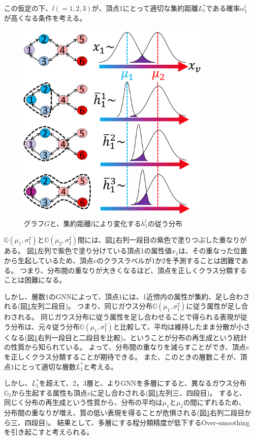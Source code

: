 \documentclass[a4j,twocolumn]{jsarticle}
\begin{document}
この仮定の下、$l(=1,2,3)$が、頂点1にとって適切な集約距離$L_1^*$である確率$\alpha_1^l$が高くなる条件を考える。

\begin{figure}[!h]
  \centering
  \includegraphics[height=10cm,width=9.5cm]{example.pdf}
  \vspace{-6mm}
  \caption{グラフ$G$と、集約距離$l$により変化する$h_1^l$の従う分布}
  \label{fig_example}
\end{figure}

$\mathbb{G}(\mu_1, \sigma_1^2)$と$\mathbb{G}(\mu_2, \sigma_2^2)$間には、図\ref{fig_example}右列一段目の紫色で塗りつぶした重なりがある。
図\ref{fig_example}左列で紫色で塗り分けている頂点1の属性値$x_1$は、その重なった位置から生起しているため、頂点$v$のクラスラベルが1か2を予測することは困難である。
つまり、分布間の重なりが大きくなるほど、頂点を正しくクラス分類することは困難になる。

しかし、層数1のGNNによって、頂点$1$には、1近傍内の属性が集約、足し合わされる(図\ref{fig_example}左列二段目)。
つまり、同じガウス分布$\mathbb{G}(\mu_1, \sigma_1^2)$に従う属性が足し合わされる。
同じガウス分布に従う属性を足し合わせることで得られる表現が従う分布は、元々従う分布$\mathbb{G}(\mu_1, \sigma_1^2)$と比較して、平均は維持したまま分散が小さくなる(図\ref{fig_example}右列一段目と二段目を比較)、ということが分布の再生成という統計の性質から知られている。
よって、分布間の重なりを減らすことができ、頂点$v$を正しくクラス分類することが期待できる。
また、このときの層数こそが、頂点$1$にとって適切な層数$L_1^*$と考える。

しかし、$L_1^*$を超えて、2，3層と、よりGNNを多層にすると、異なるガウス分布$\mathbb{G}_2$から生起する属性も頂点$v$に足し合わされる(図\ref{fig_example}左列三、四段目)。
すると、同じく分布の再生成という性質から、分布の平均は$\mu_1$と$\mu_2$の間にずれるため、分布間の重なりが増え、質の低い表現を得ることが危惧される(図\ref{fig_example}右列二段目から三、四段目)。
結果として、多層にする程分類精度が低下するOver-smoothingを引き起こすと考えられる。
\end{document}
